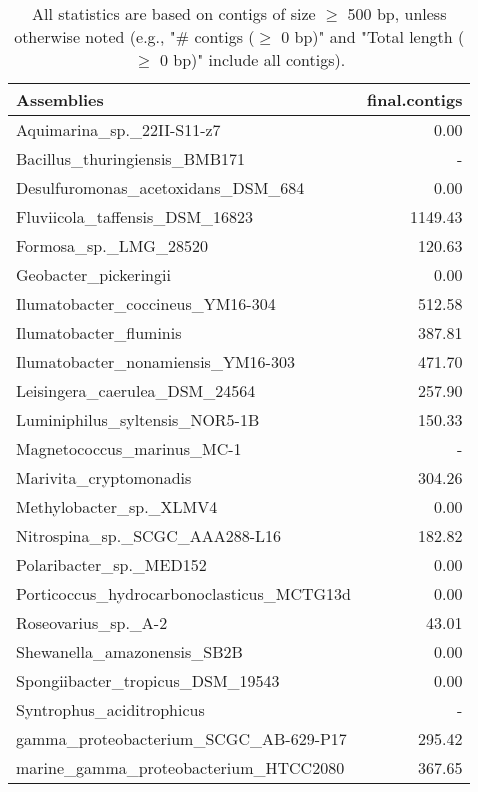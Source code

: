 \documentclass[12pt,a4paper]{article}
\begin{document}
\begin{table}[ht]
\begin{center}
\caption{All statistics are based on contigs of size $\geq$ 500 bp, unless otherwise noted (e.g., "\# contigs ($\geq$ 0 bp)" and "Total length ($\geq$ 0 bp)" include all contigs).}
\begin{tabular}{|l*{1}{|r}|}
\hline
Assemblies & final.contigs \\ \hline
Aquimarina\_sp.\_22II-S11-z7 & 0.00 \\ \hline
Bacillus\_thuringiensis\_BMB171 & - \\ \hline
Desulfuromonas\_acetoxidans\_DSM\_684 & 0.00 \\ \hline
Fluviicola\_taffensis\_DSM\_16823 & 1149.43 \\ \hline
Formosa\_sp.\_LMG\_28520 & 120.63 \\ \hline
Geobacter\_pickeringii & 0.00 \\ \hline
Ilumatobacter\_coccineus\_YM16-304 & 512.58 \\ \hline
Ilumatobacter\_fluminis & 387.81 \\ \hline
Ilumatobacter\_nonamiensis\_YM16-303 & 471.70 \\ \hline
Leisingera\_caerulea\_DSM\_24564 & 257.90 \\ \hline
Luminiphilus\_syltensis\_NOR5-1B & 150.33 \\ \hline
Magnetococcus\_marinus\_MC-1 & - \\ \hline
Marivita\_cryptomonadis & 304.26 \\ \hline
Methylobacter\_sp.\_XLMV4 & 0.00 \\ \hline
Nitrospina\_sp.\_SCGC\_AAA288-L16 & 182.82 \\ \hline
Polaribacter\_sp.\_MED152 & 0.00 \\ \hline
Porticoccus\_hydrocarbonoclasticus\_MCTG13d & 0.00 \\ \hline
Roseovarius\_sp.\_A-2 & 43.01 \\ \hline
Shewanella\_amazonensis\_SB2B & 0.00 \\ \hline
Spongiibacter\_tropicus\_DSM\_19543 & 0.00 \\ \hline
Syntrophus\_aciditrophicus & - \\ \hline
gamma\_proteobacterium\_SCGC\_AB-629-P17 & 295.42 \\ \hline
marine\_gamma\_proteobacterium\_HTCC2080 & 367.65 \\ \hline
\end{tabular}
\end{center}
\end{table}
\end{document}
